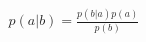 \documentclass[10pt]{article}
\begin{document}
\begin{align*}p(a|b) = \frac{p(b|a)p(a)}{p(b)}\end{align*}
\end{document}
